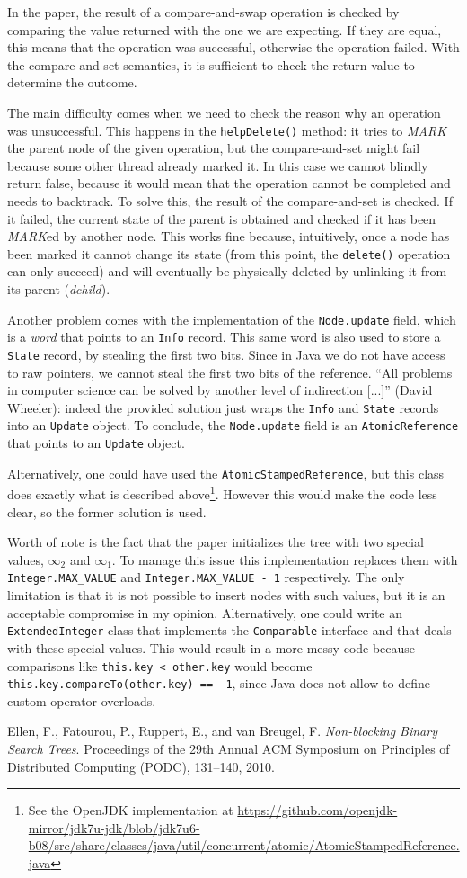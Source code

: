 \documentclass[a4paper,12pt]{article}
\begin{document}
In the paper, the result of a compare-and-swap operation is checked by comparing the value returned with the one we are expecting. If they are equal, this means that the operation was successful, otherwise the operation failed.
With the compare-and-set semantics, it is sufficient to check the return value to determine the outcome.

The main difficulty comes when we need to check the reason why an operation was unsuccessful.
This happens in the \texttt{helpDelete()} method: it tries to \emph{MARK} the parent node of the given operation, but the compare-and-set might fail because some other thread already marked it.
In this case we cannot blindly return false, because it would mean that the operation cannot be completed and needs to backtrack.
To solve this, the result of the compare-and-set is checked.
If it failed, the current state of the parent is obtained and checked if it has been \emph{MARK}ed by another node.
This works fine because, intuitively, once a node has been marked it cannot change its state (from this point, the \texttt{delete()} operation can only succeed) and will eventually be physically deleted by unlinking it from its parent (\emph{dchild}).

Another problem comes with the implementation of the \texttt{Node.update} field, which is a \emph{word} that points to an \texttt{Info} record.
This same word is also used to store a \texttt{State} record, by stealing the first two bits.
Since in Java we do not have access to raw pointers, we cannot steal the first two bits of the reference.
``All problems in computer science can be solved by another level of indirection [...]'' (David Wheeler): indeed the provided solution just wraps the \texttt{Info} and \texttt{State} records into an \texttt{Update} object.
To conclude, the \texttt{Node.update} field is an \texttt{Atomic\-Reference} that points to an \texttt{Update} object.

Alternatively, one could have used the \texttt{AtomicStampedReference}, but this class does exactly what is described above\footnote{See the OpenJDK implementation at \url{https://github.com/openjdk-mirror/jdk7u-jdk/blob/jdk7u6-b08/src/share/classes/java/util/concurrent/atomic/AtomicStampedReference.java}}.
However this would make the code less clear, so the former solution is used.

Worth of note is the fact that the paper initializes the tree with two special values, $\infty_2$ and $\infty_1$. To manage this issue this implementation replaces them with \texttt{Integer.MAX\_VALUE} and \texttt{Integer.MAX\_VALUE - 1} respectively. The only limitation is that it is not possible to insert nodes with such values, but it is an acceptable compromise in my opinion. Alternatively, one could write an \texttt{ExtendedInteger} class that implements the \texttt{Comparable} interface and that deals with these special values. This would result in a more messy code because comparisons like \texttt{this.key < other.key} would become \texttt{this.key.compareTo(other.key) == -1}, since Java does not allow to define custom operator overloads.


\begin{thebibliography}{9}
     Ellen, F., Fatourou, P., Ruppert, E., and van Breugel, F. \emph{Non-blocking Binary Search Trees}. Proceedings of the 29th Annual ACM Symposium on Principles of Distributed Computing (PODC), 131–140, 2010.
\end{thebibliography}
\end{document}
